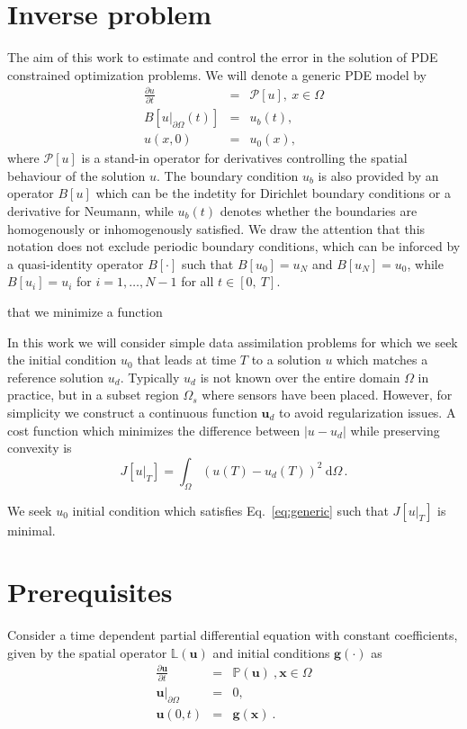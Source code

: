 \documentclass[10pt]{article}
\renewcommand{\d}{\mathrm{d}}
\newcommand{\dd}{\:\textrm{d}}
\newcommand{\CostFcn}{J}
\newcommand{\CostIntegrand}{g}
\begin{document}
\section{Inverse problem\label{sec:inverse}}
The aim of this work to estimate and control the error in the solution of PDE constrained optimization problems.
We will denote a generic PDE model by
\begin{eqnarray}
 \frac{\partial u}{\partial t} &=& \mathcal P[ u ] , \  x \in \Omega \\ \nonumber
   B[u|_{\partial \Omega}(t)]&=& u_b(t), \\ \nonumber
   u( x,0)&=& u_0( x),\label{eq:generic}
\end{eqnarray} 
where $\mathcal P[ u ]$ is a stand-in operator for derivatives controlling the spatial behaviour of the solution $u$. The boundary condition $u_b$ is also provided by an operator $B[u]$ which can be the indetity for Dirichlet boundary conditions or a derivative for Neumann, while $u_b(t)$ denotes whether the boundaries are homogenously or inhomogenously satisfied. We draw the attention that this notation does not exclude periodic boundary conditions, which can be inforced by a quasi-identity operator $B[\cdot]$ such that $B[u_0]=u_N$ and $B[u_N]=u_0$, while $B[u_i]=u_i$ for $i=1,\ldots,N-1$ for all $t\in [0,\ T]$.

that we minimize a function
%
%

In this work we will consider simple data assimilation problems  for which we seek the initial condition $u_0$ that leads at time $T$ to a solution
$u$ which matches a reference solution $u_d$. Typically $ u_d$  is not known over the entire domain $\Omega$
in practice, but in a subset region $\Omega_s$ where sensors have been
placed. However, for simplicity we construct a continuous function
$\mathbf u_d$ to avoid regularization issues. 
A cost function which minimizes the difference between $| u- u_d|$ while preserving convexity is
$$J[u|_T]=\int_{\Omega}(u(T)- u_d(T))^2 \ \d \Omega \,. $$


We seek $u_0$ initial condition which satisfies Eq.~\ref{eq:generic} such that $J[ u|_T]$ is minimal.

\section{Prerequisites}
Consider a time dependent partial differential equation with constant coefficients, given by the spatial operator $ \mathbb L(\mathbf u)$ and initial conditions $\mathbf g(\cdot)$ as
\begin{eqnarray}
 \frac{\partial\mathbf u}{\partial t} &=&  \mathbb P(\mathbf u) \ , \mathbf x \in \Omega \\ \nonumber
  \mathbf u|_{\partial \Omega}&=&0, \\ 
  \mathbf u(0,t)&=&\mathbf g(\mathbf x) \ . \nonumber \label{eq:generic}
\end{eqnarray} 
\end{document}
